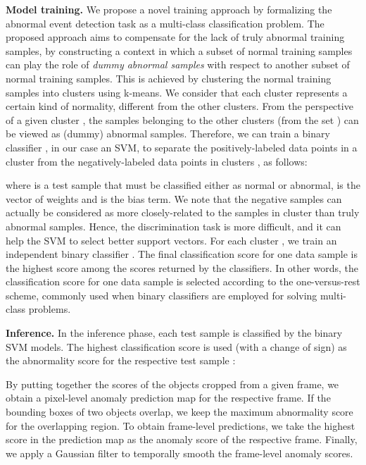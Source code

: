 \documentclass[10pt,twocolumn,letterpaper]{article}
\begin{document}
\noindent
{\bf Model training.}
We propose a novel training approach by formalizing the abnormal event detection task as a multi-class classification problem. The proposed approach aims to compensate for the lack of truly abnormal training samples, by constructing a context in which a subset of normal training samples can play the role of \emph{dummy abnormal samples} with respect to another subset of normal training samples. This is achieved by clustering the normal training samples into  clusters using k-means. We consider that each cluster represents a certain kind of normality, different from the other clusters. From the perspective of a given cluster , the samples belonging to the other clusters (from the set ) can be viewed as (dummy) abnormal samples. Therefore, we can train a binary classifier , in our case an SVM, to separate the positively-labeled data points in a cluster  from the negatively-labeled data points in clusters , as follows:

where  is a test sample that must be classified either as normal or abnormal,  is the vector of weights and  is the bias term. We note that the negative samples can actually be considered as more closely-related to the samples in cluster  than truly abnormal samples. Hence, the discrimination task is more difficult, and it can help the SVM to select better support vectors. For each cluster , we train an independent binary classifier . The final classification score for one data sample is the highest score among the scores returned by the  classifiers. In other words, the classification score for one data sample is selected according to the one-versus-rest scheme, commonly used when binary classifiers are employed for solving multi-class problems.

\noindent
{\bf Inference.}
In the inference phase, each test sample  is classified by the  binary SVM models. The highest classification score is used (with a change of sign) as the abnormality score  for the respective test sample :
\setlength{\abovedisplayskip}{3pt}
\setlength{\belowdisplayskip}{3pt}

By putting together the scores of the objects cropped from a given frame, we obtain a pixel-level anomaly prediction map for the respective frame. If the bounding boxes of two objects overlap, we keep the maximum abnormality score for the overlapping region. To obtain frame-level predictions, we take the highest score in the prediction map as the anomaly score of the respective frame. Finally, we apply a Gaussian filter to temporally smooth the frame-level anomaly scores.
\end{document}
